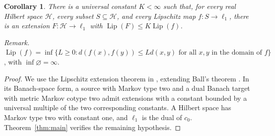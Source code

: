 \documentclass[11pt]{article}
\newtheorem{corollary}[theorem]{Corollary}
\theoremstyle{definition}
\theoremstyle{remark}
\numberwithin{equation}{section}
\DeclareMathOperator{\Lip}{Lip}
\begin{document}
\begin{corollary}\label{cor:extension}
There is a universal constant $K<\infty$ such that, for every
real Hilbert space $\mathcal H$, every subset $S\subseteq\mathcal H$,
and every Lipschitz map $f:S\to\ell_1$, there is an extension
$F:\mathcal H\to\ell_1$ with
$\Lip(F)\leq K\Lip(f)$.
\end{corollary}

\noindent\textit{Remark.} $\Lip(f)=\inf\{L\geq0:d(f(x),f(y))\leq Ld(x,y)\text{ for all }x,y\text{ in the domain of }f\}$, with $\inf\varnothing=\infty$.

\begin{proof}
We use the Lipschitz extension theorem in
\cite[Corollary~1.13]{MendelNaor13}, extending Ball's theorem
\cite{Ball92}. In its Banach-space form, a source with Markov
type two and a dual Banach target with metric Markov cotype two
admit extensions with a constant bounded by a universal multiple
of the two corresponding constants. A Hilbert space has Markov
type two with constant one, and $\ell_1$ is the dual of $c_0$.
Theorem~\ref{thm:main} verifies the remaining hypothesis.
\end{proof}




\end{document}
